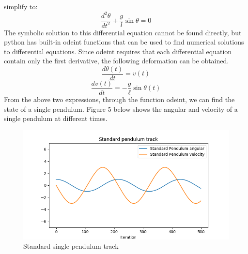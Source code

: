 \documentclass[11pt,a4paper]{article}
\begin{document}
simplify to:
\begin{equation}
\frac{d^{2} \theta}{d t^{2}}+\frac{g}{l} \sin \theta=0
\end{equation}
The symbolic solution to this differential equation cannot be found directly, but python has built-in odeint functions that can be used to find numerical solutions to differential equations. Since odeint requires that each differential equation contain only the first derivative, the following deformation can be obtained.
\begin{equation}
\frac{d \theta(t)}{d t}=v(t)
\end{equation}
\begin{equation}
\frac{d v(t)}{d t}=-\frac{g}{\ell} \sin \theta(t)
\end{equation}
From the above two expressions, through the function odeint, we can find the state of a single pendulum. Figure 5 below shows the angular and velocity of a single pendulum at different times.
\\
\begin{figure}[h]
\centering
\includegraphics[scale=0.5]{6.png}
\caption{Standard single pendulum track}
\label{fig:Standard single pendulum track}
\end{figure}
\\
\end{document}
